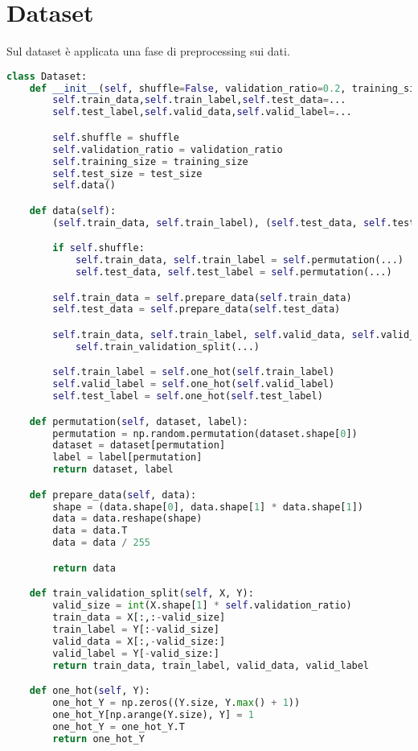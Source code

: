 \section{Dataset}
Sul dataset è applicata una fase di preprocessing sui dati.
\begin{lstlisting}[language=Python]
class Dataset:
    def __init__(self, shuffle=False, validation_ratio=0.2, training_size=10000, test_size=2500):
        self.train_data,self.train_label,self.test_data=...
        self.test_label,self.valid_data,self.valid_label=...

        self.shuffle = shuffle
        self.validation_ratio = validation_ratio
        self.training_size = training_size
        self.test_size = test_size
        self.data()

    def data(self):
        (self.train_data, self.train_label), (self.test_data, self.test_label) = mnist.load_data()

        if self.shuffle:
            self.train_data, self.train_label = self.permutation(...)
            self.test_data, self.test_label = self.permutation(...)

        self.train_data = self.prepare_data(self.train_data)
        self.test_data = self.prepare_data(self.test_data)

        self.train_data, self.train_label, self.valid_data, self.valid_label =  \
            self.train_validation_split(...)

        self.train_label = self.one_hot(self.train_label)
        self.valid_label = self.one_hot(self.valid_label)
        self.test_label = self.one_hot(self.test_label)

    def permutation(self, dataset, label):
        permutation = np.random.permutation(dataset.shape[0])
        dataset = dataset[permutation]
        label = label[permutation]
        return dataset, label

    def prepare_data(self, data):
        shape = (data.shape[0], data.shape[1] * data.shape[1])
        data = data.reshape(shape)
        data = data.T
        data = data / 255

        return data

    def train_validation_split(self, X, Y):
        valid_size = int(X.shape[1] * self.validation_ratio)
        train_data = X[:,:-valid_size]
        train_label = Y[:-valid_size]
        valid_data = X[:,-valid_size:]
        valid_label = Y[-valid_size:]
        return train_data, train_label, valid_data, valid_label

    def one_hot(self, Y):
        one_hot_Y = np.zeros((Y.size, Y.max() + 1))
        one_hot_Y[np.arange(Y.size), Y] = 1
        one_hot_Y = one_hot_Y.T
        return one_hot_Y
\end{lstlisting}

